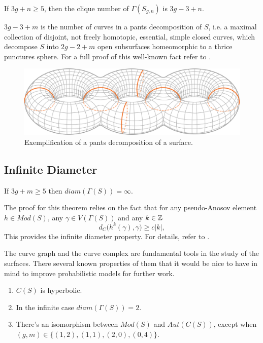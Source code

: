 \begin{theorem}
If $3g+n\geq 5$, then the clique number of $\Gamma(S_{g,n})$ is $3g - 3 + n$.
\end{theorem}

$3g-3+m$ is the number of curves in a pants decomposition of $S$, i.e. a maximal collection of disjoint, not freely homotopic, essential, simple closed curves, which decompose $S$ into $2g-2+m$ open subsurfaces homeomorphic to a thrice punctures sphere. For a full proof of this well-known fact refer to \cite[Hatcher, Thurston 80]{Pants}.

\vspace{0.5cm}
\begin{figure}[h!]
	\centering
	\includegraphics[scale=0.4]{Figures/Pantalones.png}
	\caption{Exemplification of a pants decomposition of a surface.}
\end{figure}

\subsection{Infinite Diameter}
\begin{theorem}
If $3g+m\geq 5$ then $diam(\Gamma(S)) = \infty$.
\end{theorem}

The proof for this theorem relies on the fact that for any pseudo-Anosov element $h \in Mod(S)$, any $\gamma \in V(\Gamma(S))$ and any $k\in \mathbb{Z}$
$$d_{C}\Big(h^{k}(\gamma), \gamma\Big) \geq c|k|,$$
This provides the infinite diameter property. For details, refer to \cite[Masur, Minsky 99]{Masur}.

The curve graph and the curve complex are fundamental tools in the study of the surfaces. There several known properties of them that it would be nice to have in mind to improve probabilistic models for further work.

\begin{enumerate}
\item $C(S)$ is hyperbolic.
\item In the infinite case $diam(\Gamma(S))= 2$.
\item There's an isomorphism between $Mod(S)$ and $Aut(C(S))$, except when $(g,m) \in \{(1,2), (1,1), (2,0), (0,4)\}$.
\end{enumerate}

